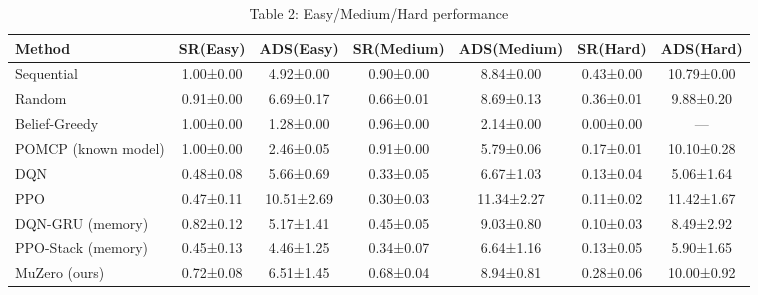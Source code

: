 \begin{table}[htbp]
\centering
\caption{Table 2: Easy/Medium/Hard performance}
\begin{tabular}{lcccccc}
\toprule
Method & SR(Easy) & ADS(Easy) & SR(Medium) & ADS(Medium) & SR(Hard) & ADS(Hard) \\
\midrule
Sequential & 1.00±0.00 & 4.92±0.00 & 0.90±0.00 & 8.84±0.00 & 0.43±0.00 & 10.79±0.00 \\
Random & 0.91±0.00 & 6.69±0.17 & 0.66±0.01 & 8.69±0.13 & 0.36±0.01 & 9.88±0.20 \\
Belief-Greedy & 1.00±0.00 & 1.28±0.00 & 0.96±0.00 & 2.14±0.00 & 0.00±0.00 & — \\
POMCP (known model) & 1.00±0.00 & 2.46±0.05 & 0.91±0.00 & 5.79±0.06 & 0.17±0.01 & 10.10±0.28 \\
DQN & 0.48±0.08 & 5.66±0.69 & 0.33±0.05 & 6.67±1.03 & 0.13±0.04 & 5.06±1.64 \\
PPO & 0.47±0.11 & 10.51±2.69 & 0.30±0.03 & 11.34±2.27 & 0.11±0.02 & 11.42±1.67 \\
DQN-GRU (memory) & 0.82±0.12 & 5.17±1.41 & 0.45±0.05 & 9.03±0.80 & 0.10±0.03 & 8.49±2.92 \\
PPO-Stack (memory) & 0.45±0.13 & 4.46±1.25 & 0.34±0.07 & 6.64±1.16 & 0.13±0.05 & 5.90±1.65 \\
MuZero (ours) & 0.72±0.08 & 6.51±1.45 & 0.68±0.04 & 8.94±0.81 & 0.28±0.06 & 10.00±0.92 \\
\bottomrule
\end{tabular}
\end{table}
